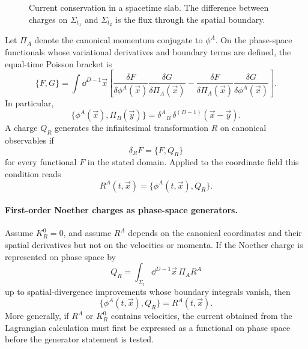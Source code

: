 \begin{figure}[H]
\centering
{}
\caption{Current conservation in a spacetime slab.  The difference between
charges on \(\Sigma_{t_1}\) and \(\Sigma_{t_2}\) is the flux through the
spatial boundary.}
\label{fig:current-conservation-boundary-flux}
\end{figure}

\begin{definition}
\label{def:equal-time-poisson-generator}
Let \(\Pi_A\) denote the canonical momentum conjugate to \(\phi^A\).  On the
phase-space functionals whose variational derivatives and boundary terms are
defined, the equal-time Poisson bracket is
\[
  \{F,G\}
  =
  \int\dd^{D-1}\vec x
  \left[
    \frac{\delta F}{\delta\phi^A(\vec x)}
    \frac{\delta G}{\delta\Pi_A(\vec x)}
    -
    \frac{\delta F}{\delta\Pi_A(\vec x)}
    \frac{\delta G}{\delta\phi^A(\vec x)}
  \right].
\]
In particular,
\[
  \{\phi^A(\vec x),\Pi_B(\vec y)\}
  =
  \delta^A{}_B\,\delta^{(D-1)}(\vec x-\vec y).
\]
A charge \(Q_R\) generates the infinitesimal transformation \(R\) on canonical
observables if
\[
  \delta_R F=\{F,Q_R\}
\]
for every functional \(F\) in the stated domain.  Applied to the coordinate
field this condition reads
\[
  R^A(t,\vec x)=\{\phi^A(t,\vec x),Q_R\}.
\]
\end{definition}

\paragraph{First-order Noether charges as phase-space generators.}
Assume \(K_R^0=0\), and assume \(R^A\) depends on the canonical coordinates
and their spatial derivatives but not on the velocities or momenta.  If the
Noether charge is represented on phase space by
\[
  Q_R=\int_{\Sigma_t}\dd^{D-1}\vec x\,\Pi_A R^A
\]
up to spatial-divergence improvements whose boundary integrals vanish, then
\[
  \{\phi^A(t,\vec x),Q_R\}=R^A(t,\vec x).
\]
More generally, if \(R^A\) or \(K_R^0\) contains velocities, the current
obtained from the Lagrangian calculation must first be expressed as a
functional on phase space before the generator statement is tested.

